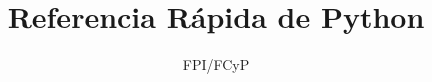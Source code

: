 \documentclass[10pt]{article}
\title{Referencia Rápida de Python}
\author{FPI/FCyP}
\begin{document}

\maketitle
\begin{multicols*}{3}





\end{multicols*}
\end{document}
